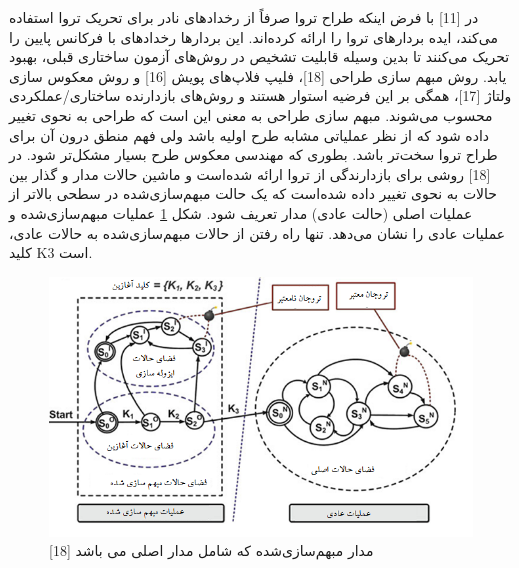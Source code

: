 در [11] با فرض اینکه طراح تروا صرفاً از رخدادهای نادر برای تحریک تروا استفاده می‌کند، ایده بردارهای تروا را ارائه کرده‌اند. این بردارها رخدادهای با فرکانس پایین را تحریک می‌کنند تا بدین وسیله قابلیت تشخیص در روش‌های آزمون ساختاری قبلی، بهبود یابد. روش مبهم سازی طراحی [18]، فلیپ فلاپ‌های پویش [16] و روش معکوس سازی ولتاژ [17]، همگی بر این فرضیه استوار هستند و روش‌های بازدارنده ساختاری/عملکردی محسوب می‌شوند.
مبهم سازی طراحی به معنی این است که طراحی به نحوی تغییر داده شود که از نظر عملیاتی مشابه طرح اولیه باشد ولی فهم منطق درون آن برای طراح تروا سخت‌تر باشد. بطوری که مهندسی معکوس طرح بسیار مشکل‌تر شود. در [18] روشی برای بازدارندگی از تروا ارائه شده‌است و ماشین حالات مدار و گذار بین حالات به نحوی تغییر داده شده‌است که یک حالت مبهم‌سازی‌شده در سطحی بالاتر از عملیات اصلی (حالت عادی) مدار تعریف شود. شکل \ref{fig4-5} عملیات مبهم‌سازی‌شده و عملیات عادی را نشان می‌دهد. تنها راه رفتن از حالات مبهم‌سازی‌شده به حالات عادی، کلید K3 است.
   \begin{figure}
\begin{center}
\includegraphics[scale=1]{figs/fig4-5.png}
\caption{مدار مبهم‌سازی‌شده که شامل مدار اصلی می باشد [18]}
\label{fig4-5}
\end{center}
\end{figure} 
 
